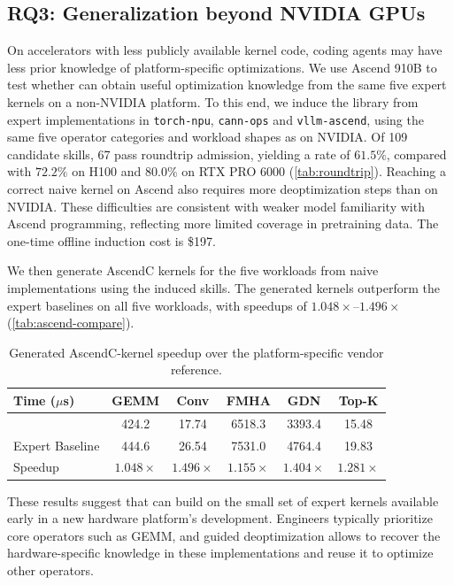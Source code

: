\subsection{RQ3: Generalization beyond NVIDIA GPUs}
\label{sec:exp-ascend}

On accelerators with less publicly available kernel code, coding agents may have less prior knowledge of platform-specific optimizations. We use Ascend 910B to test whether \sys{} can obtain useful optimization knowledge from the same five expert kernels on a non-NVIDIA platform.
To this end, we induce the library from expert implementations in \texttt{torch-npu}, \texttt{cann-ops} and \texttt{vllm-ascend}, using the same five operator categories and workload shapes as on NVIDIA. Of 109 candidate skills, 67 pass roundtrip admission, yielding a rate of $61.5\%$, compared with $72.2\%$ on H100 and $80.0\%$ on RTX PRO 6000 (\autoref{tab:roundtrip}). Reaching a correct naive kernel on Ascend also requires more deoptimization steps than on NVIDIA. These difficulties are consistent with weaker model familiarity with Ascend programming, reflecting more limited coverage in pretraining data. The one-time offline induction cost is \$197.

We then generate AscendC kernels for the five workloads from naive implementations using the induced skills. The generated kernels outperform the expert baselines on all five workloads, with speedups of $1.048\times$--$1.496\times$ (\autoref{tab:ascend-compare}).

\begin{table}[h]
  \centering
  \small
  \setlength{\tabcolsep}{4.5pt}
  \begin{tabular}{@{}lccccc@{}}
    \toprule
    \textbf{Time ($\mu$s)} & \textbf{GEMM} & \textbf{Conv} & \textbf{FMHA} & \textbf{GDN} & \textbf{Top-K} \\
    \midrule
    \sys{}     & 424.2 & 17.74 & 6518.3 & 3393.4 & 15.48 \\
    Expert Baseline  & 444.6 & 26.54 & 7531.0 & 4764.4 & 19.83 \\
    \midrule
    Speedup    & $1.048\times$ & $1.496\times$ & $1.155\times$ & $1.404\times$ & $1.281\times$ \\
    \bottomrule
  \end{tabular}
  \caption{Generated AscendC-kernel speedup over the platform-specific vendor reference.}
  \label{tab:ascend-compare}
\end{table}

These results suggest that \sys{} can build on the small set of expert kernels available early in a new hardware platform's development. Engineers typically prioritize core operators such as GEMM, and guided deoptimization allows \sys{} to recover the hardware-specific knowledge in these implementations and reuse it to optimize other operators.

